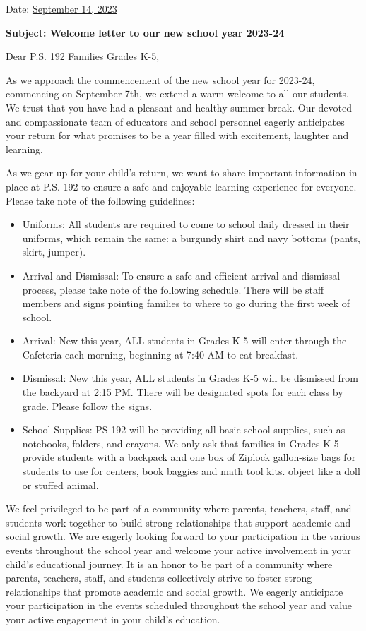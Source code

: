 \documentclass[12pt,letterpaper]{article}
\begin{document}
\vspace*{0.5in}
Date: \href{https://www.ps192.org/apps/bbmessages/show_bbm.jsp?REC_ID=139439}{September 14, 2023} 

\textbf{Subject: Welcome letter to our new school year 2023-24}

Dear P.S. 192 Families Grades K-5,

As we approach the commencement of the new school year for 2023-24, commencing on 
September 7th, we extend a warm welcome to all our students. We trust that you have had a
pleasant and healthy summer break. Our devoted and compassionate team of educators and
school personnel eagerly anticipates your return for what promises to be a year filled
with excitement, laughter and learning.

As we gear up for your child's return, we want to share important information in place at
P.S. 192 to ensure a safe and enjoyable learning experience for everyone. Please take note
of the following guidelines:
	\begin{itemize}
	\item Uniforms: All students are required to come to school daily dressed in their
	uniforms, which remain the same: a burgundy shirt and navy bottoms (pants, skirt, 
	jumper).
	\item Arrival and Dismissal: To ensure a safe and efficient arrival and dismissal 
	process, please take note of the following schedule. There will be staff members and 
	signs pointing families to where to go during the first week of school.
	\item Arrival: New this year, ALL students in Grades K-5 will enter through the 
	Cafeteria each morning, beginning at 7:40 AM to eat breakfast.
	\item Dismissal: New this year, ALL students in Grades K-5 will be dismissed from the
	backyard at 2:15 PM. There will be designated spots for each class by grade. Please
	follow the signs.
	\item School Supplies: PS 192 will be providing all basic school supplies, such as
	notebooks, folders, and crayons. We only ask that families in Grades K-5 provide
	students with a backpack and one box of Ziplock gallon-size bags for students to use
	for centers, book baggies and math tool kits. object like a doll or stuffed animal.
	\end{itemize}

We feel privileged to be part of a community where parents, teachers, staff, and students
work together to build strong relationships that support academic and social growth. We
are eagerly looking forward to your participation in the various events throughout the
school year and welcome your active involvement in your child's educational journey.
\pagebreak
\vspace*{2cm}
It is an honor to be part of a community where parents, teachers, staff, and students
collectively strive to foster strong relationships that promote academic and social growth. We eagerly anticipate your participation in the events scheduled throughout the
school year and value your active engagement in your child's education.
\end{document}
